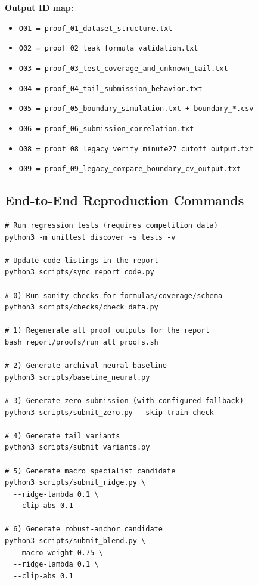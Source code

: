 \textbf{Output ID map:}
\begin{itemize}[leftmargin=1.5em]
  \item \texttt{O01 = proof\_01\_dataset\_structure.txt}
  \item \texttt{O02 = proof\_02\_leak\_formula\_validation.txt}
  \item \texttt{O03 = proof\_03\_test\_coverage\_and\_unknown\_tail.txt}
  \item \texttt{O04 = proof\_04\_tail\_submission\_behavior.txt}
  \item \texttt{O05 = proof\_05\_boundary\_simulation.txt + boundary\_*.csv}
  \item \texttt{O06 = proof\_06\_submission\_correlation.txt}
  \item \texttt{O08 = proof\_08\_legacy\_verify\_minute27\_cutoff\_output.txt}
  \item \texttt{O09 = proof\_09\_legacy\_compare\_boundary\_cv\_output.txt}
\end{itemize}
\normalsize

\subsection{End-to-End Reproduction Commands}
\begin{Verbatim}[fontsize=\small]
# Run regression tests (requires competition data)
python3 -m unittest discover -s tests -v

# Update code listings in the report
python3 scripts/sync_report_code.py

# 0) Run sanity checks for formulas/coverage/schema
python3 scripts/checks/check_data.py

# 1) Regenerate all proof outputs for the report
bash report/proofs/run_all_proofs.sh

# 2) Generate archival neural baseline
python3 scripts/baseline_neural.py

# 3) Generate zero submission (with configured fallback)
python3 scripts/submit_zero.py --skip-train-check

# 4) Generate tail variants
python3 scripts/submit_variants.py

# 5) Generate macro specialist candidate
python3 scripts/submit_ridge.py \
  --ridge-lambda 0.1 \
  --clip-abs 0.1

# 6) Generate robust-anchor candidate
python3 scripts/submit_blend.py \
  --macro-weight 0.75 \
  --ridge-lambda 0.1 \
  --clip-abs 0.1
\end{Verbatim}
